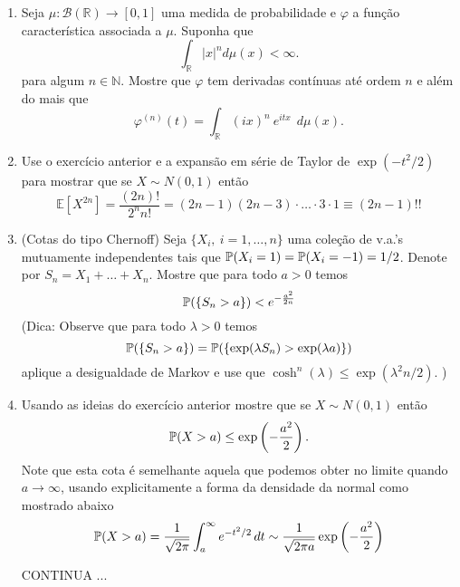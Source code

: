 \begin{enumerate}[leftmargin=*]
\item 
Seja $\mu:\mathscr{B}(\mathbb{R})\to[0,1]$ uma medida de probabilidade
e $\varphi$ a função característica associada a $\mu$.
Suponha que 
\[
	\int_{\mathbb{R}} |x|^n d\mu(x)<\infty.
\]
para algum $n\in\mathbb{N}$.
Mostre que $\varphi$ tem derivadas contínuas até ordem $n$ 
e além do mais que 
\[
\varphi^{(n)}(t)
=
\int_{\mathbb{R}} (ix)^n \ e^{itx}\ \ d\mu(x).
\]







\item Use o exercício anterior e a expansão em série de 
Taylor de $\exp(-t^2/2)$ para mostrar que se 
$X\sim N(0,1)$ então 
\[
	\mathbb{E}[X^{2n}]
	=
	\frac{(2n)!}{2^n n!}
	=
	(2n-1)(2n-3)\cdot\ldots\cdot 3\cdot 1
	\equiv 
	(2n-1)!!
\] 







\item (Cotas do tipo Chernoff)  Seja $\{X_i,\ i=1,\ldots, n\}$ uma coleção  
de v.a.'s mutuamente independentes tais que 
$\P(X_i=1)=\P(X_i=-1)=1/2$.
Denote por $S_n= X_1+\ldots +X_n$. Mostre que
para todo $a>0$ temos 
\[
	\P(\{S_n>a\})< e^{-\frac{a^2}{2n}}
\]
(Dica: Observe que para todo $\lambda>0$ temos 
$$
\P(\{S_n>a\})=\P(\{\exp(\lambda S_n)>\exp(\lambda a)\}) 
$$
aplique a desigualdade de Markov e use que 
$\cosh^n(\lambda)\leq \exp(\lambda^2 n/2).$
)


\item Usando as ideias do exercício anterior 
mostre que se $X\sim N(0,1)$ então 
\[
	\P(X>a)\leq \exp\left(-\frac{a^2}{2}\right).
\]
Note que esta cota é semelhante aquela que
podemos obter no limite quando $a\to \infty$, 
usando explicitamente a forma
da densidade da normal como mostrado abaixo 
\[
\P(X>a) 
= 
\frac{1}{\sqrt{2\pi}}
\int_{a}^{\infty} e^{-t^2/2}\, dt
\sim 
\frac{1}{\sqrt{2\pi a}}
\exp\left(-\frac{a^2}{2}\right)
\]


\begin{center}
{\red CONTINUA ...}
\end{center}





\end{enumerate}



